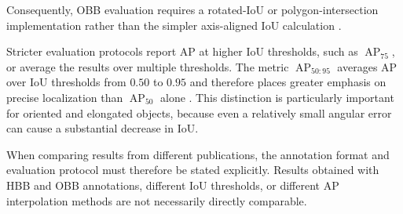 Consequently, OBB evaluation requires a rotated-IoU or polygon-intersection implementation rather than the simpler axis-aligned IoU calculation \cite{ding2021object}.

Stricter evaluation protocols report AP at higher IoU thresholds, such as $\operatorname{AP}_{75}$, or average the results over multiple thresholds. The metric $\operatorname{AP}_{50:95}$ averages AP over IoU thresholds from $0.50$ to $0.95$ and therefore places greater emphasis on precise localization than $\operatorname{AP}_{50}$ alone \cite{yang2022arbitrary}. This distinction is particularly important for oriented and elongated objects, because even a relatively small angular error can cause a substantial decrease in IoU.

When comparing results from different publications, the annotation format and evaluation protocol must therefore be stated explicitly. Results obtained with HBB and OBB annotations, different IoU thresholds, or different AP interpolation methods are not necessarily directly comparable.
